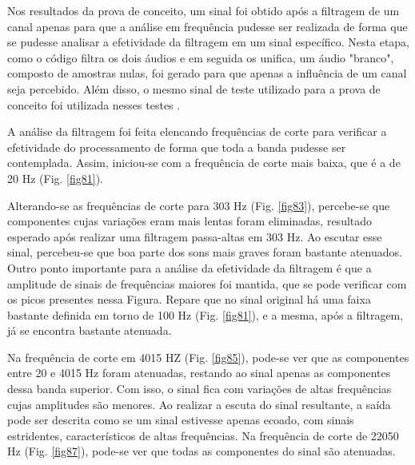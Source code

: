 Nos resultados da prova de conceito, um sinal foi obtido após a filtragem de um canal apenas para que a análise em frequência pudesse ser realizada de forma que se pudesse analisar a efetividade da filtragem em um sinal específico. Nesta etapa, como o código filtra os dois áudios e em seguida os unifica, um áudio "branco", composto de amostras nulas, foi gerado para que apenas a influência de um canal seja percebido. 
Além disso, o mesmo sinal de teste utilizado para a prova de conceito foi utilizada nesses testes \cite{track01}.



A análise da filtragem foi feita elencando frequências de corte para verificar a efetividade do processamento de forma que toda a banda pudesse ser contemplada. Assim, iniciou-se com a frequência de corte mais baixa, que é a de 20 Hz (Fig. \ref{fig81}). 

Alterando-se as frequências de corte para 303 Hz (Fig. \ref{fig83}), percebe-se que componentes cujas variações eram mais lentas foram eliminadas, resultado esperado após realizar uma filtragem passa-altas em 303 Hz. Ao escutar esse sinal, percebeu-se que boa parte dos sons mais graves foram bastante atenuados. Outro ponto importante para a análise da efetividade da filtragem é que a amplitude de sinais de frequências maiores foi mantida, que se pode verificar com os picos presentes nessa Figura. Repare que no sinal original há uma faixa bastante definida em torno de 100 Hz (Fig. \ref{fig81}), e a mesma, após a filtragem, já se encontra bastante atenuada.

Na frequência de corte em 4015 HZ (Fig. \ref{fig85}), pode-se ver que as componentes entre 20 e 4015 Hz foram atenuadas, restando ao sinal apenas as componentes dessa banda superior. Com isso, o sinal fica com variações de altas frequências cujas amplitudes são menores. Ao realizar a escuta do sinal resultante, a saída pode ser descrita como se um sinal estivesse apenas ecoado, com sinais estridentes, característicos de altas frequências. 
Na frequência de corte de 22050 Hz (Fig. \ref{fig87}), pode-se ver que todas as componentes do sinal são atenuadas. 

